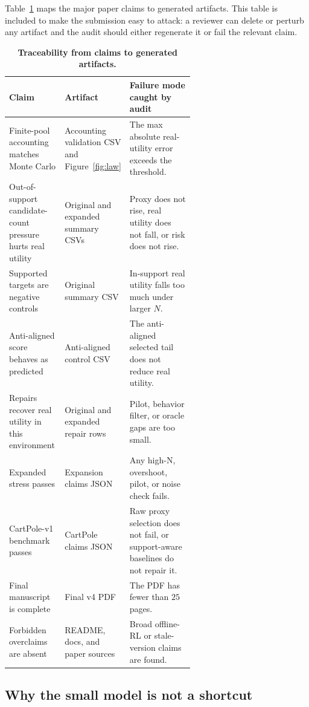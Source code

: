 Table~\ref{tab:traceability} maps the major paper claims to generated artifacts. This table is included to make the submission easy to attack: a reviewer can delete or perturb any artifact and the audit should either regenerate it or fail the relevant claim.

\begin{table}[t]
\centering
\small
\caption{\textbf{Traceability from claims to generated artifacts.}}
\label{tab:traceability}
\begin{tabularx}{\linewidth}{p{0.30\linewidth}p{0.31\linewidth}X}
\toprule
Claim & Artifact & Failure mode caught by audit \\
\midrule
Finite-pool accounting matches Monte Carlo & Accounting validation CSV and Figure~\ref{fig:law} & The max absolute real-utility error exceeds the threshold. \\
Out-of-support candidate-count pressure hurts real utility & Original and expanded summary CSVs & Proxy does not rise, real utility does not fall, or risk does not rise. \\
Supported targets are negative controls & Original summary CSV & In-support real utility falls too much under larger $N$. \\
Anti-aligned score behaves as predicted & Anti-aligned control CSV & The anti-aligned selected tail does not reduce real utility. \\
Repairs recover real utility in this environment & Original and expanded repair rows & Pilot, behavior filter, or oracle gaps are too small. \\
Expanded stress passes & Expansion claims JSON & Any high-N, overshoot, pilot, or noise check fails. \\
CartPole-v1 benchmark passes & CartPole claims JSON & Raw proxy selection does not fail, or support-aware baselines do not repair it. \\
Final manuscript is complete & Final v4 PDF & The PDF has fewer than $25$ pages. \\
Forbidden overclaims are absent & README, docs, and paper sources & Broad offline-RL or stale-version claims are found. \\
\bottomrule
\end{tabularx}
\end{table}

\subsection{Why the small model is not a shortcut}

